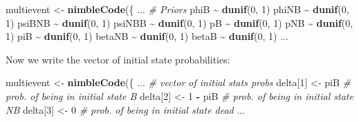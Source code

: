\documentclass[
  12pt,
]{krantz}
\newenvironment{Shaded}{\begin{snugshade}}{\end{snugshade}}
\newcommand{\CommentTok}[1]{\textcolor[rgb]{0.56,0.35,0.01}{\textit{#1}}}
\newcommand{\DecValTok}[1]{\textcolor[rgb]{0.00,0.00,0.81}{#1}}
\newcommand{\FunctionTok}[1]{\textcolor[rgb]{0.13,0.29,0.53}{\textbf{#1}}}
\newcommand{\NormalTok}[1]{#1}
\newcommand{\OtherTok}[1]{\textcolor[rgb]{0.56,0.35,0.01}{#1}}
\newcommand{\SpecialCharTok}[1]{\textcolor[rgb]{0.81,0.36,0.00}{\textbf{#1}}}
\begin{document}
\begin{Shaded}
\begin{Highlighting}[]
\NormalTok{multievent }\OtherTok{\textless{}{-}} \FunctionTok{nimbleCode}\NormalTok{(\{}
\NormalTok{...}
  \CommentTok{\# Priors}
\NormalTok{  phiB }\SpecialCharTok{\textasciitilde{}} \FunctionTok{dunif}\NormalTok{(}\DecValTok{0}\NormalTok{, }\DecValTok{1}\NormalTok{)}
\NormalTok{  phiNB }\SpecialCharTok{\textasciitilde{}} \FunctionTok{dunif}\NormalTok{(}\DecValTok{0}\NormalTok{, }\DecValTok{1}\NormalTok{)}
\NormalTok{  psiBNB }\SpecialCharTok{\textasciitilde{}} \FunctionTok{dunif}\NormalTok{(}\DecValTok{0}\NormalTok{, }\DecValTok{1}\NormalTok{)}
\NormalTok{  psiNBB }\SpecialCharTok{\textasciitilde{}} \FunctionTok{dunif}\NormalTok{(}\DecValTok{0}\NormalTok{, }\DecValTok{1}\NormalTok{)}
\NormalTok{  pB }\SpecialCharTok{\textasciitilde{}} \FunctionTok{dunif}\NormalTok{(}\DecValTok{0}\NormalTok{, }\DecValTok{1}\NormalTok{)}
\NormalTok{  pNB }\SpecialCharTok{\textasciitilde{}} \FunctionTok{dunif}\NormalTok{(}\DecValTok{0}\NormalTok{, }\DecValTok{1}\NormalTok{)}
\NormalTok{  piB }\SpecialCharTok{\textasciitilde{}} \FunctionTok{dunif}\NormalTok{(}\DecValTok{0}\NormalTok{, }\DecValTok{1}\NormalTok{)}
\NormalTok{  betaNB }\SpecialCharTok{\textasciitilde{}} \FunctionTok{dunif}\NormalTok{(}\DecValTok{0}\NormalTok{, }\DecValTok{1}\NormalTok{)}
\NormalTok{  betaB }\SpecialCharTok{\textasciitilde{}} \FunctionTok{dunif}\NormalTok{(}\DecValTok{0}\NormalTok{, }\DecValTok{1}\NormalTok{)}
\NormalTok{...}
\end{Highlighting}
\end{Shaded}

Now we write the vector of initial state probabilities:

\begin{Shaded}
\begin{Highlighting}[]
\NormalTok{multievent }\OtherTok{\textless{}{-}} \FunctionTok{nimbleCode}\NormalTok{(\{}
\NormalTok{...}
  \CommentTok{\# vector of initial stats probs}
\NormalTok{  delta[}\DecValTok{1}\NormalTok{] }\OtherTok{\textless{}{-}}\NormalTok{ piB }\CommentTok{\# prob. of being in initial state B}
\NormalTok{  delta[}\DecValTok{2}\NormalTok{] }\OtherTok{\textless{}{-}} \DecValTok{1} \SpecialCharTok{{-}}\NormalTok{ piB }\CommentTok{\# prob. of being in initial state NB}
\NormalTok{  delta[}\DecValTok{3}\NormalTok{] }\OtherTok{\textless{}{-}} \DecValTok{0} \CommentTok{\# prob. of being in initial state dead}
\NormalTok{...}
\end{Highlighting}
\end{Shaded}
\end{document}
